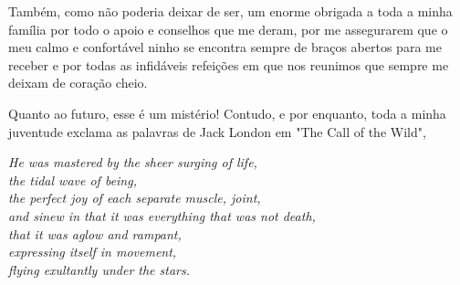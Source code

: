 Também, como não poderia deixar de ser, um enorme obrigada a toda a minha família por todo o apoio e conselhos que me deram, por me assegurarem que o meu calmo e confortável ninho se encontra sempre de braços abertos para me receber e por todas as infidáveis refeições em que nos reunimos que sempre me deixam de coração cheio. 

Quanto ao futuro, esse é um mistério! Contudo, e por enquanto, toda a minha juventude exclama as palavras de Jack London em "The Call of the Wild",
\begin{flushright}
	\textit{He was mastered by the sheer surging of life,\\
		the tidal wave of being,\\ 
		the perfect joy of each separate muscle, joint,\\
		and sinew in that it was everything that was not death,\\ that it was aglow and rampant,\\
		expressing itself in movement,\\
		flying exultantly under the stars.}
\end{flushright}



